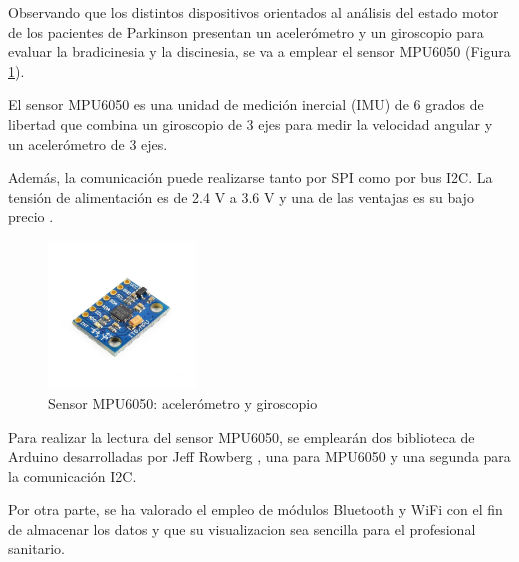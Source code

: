 Observando que los distintos dispositivos orientados al análisis del estado motor de los pacientes de Parkinson presentan un acelerómetro y un giroscopio para evaluar la bradicinesia y la discinesia, se va a emplear el sensor MPU6050 (Figura \ref{fig:MPU6050}). 

El sensor MPU6050 es una unidad de medición inercial (IMU) de 6 grados de libertad que combina un giroscopio de 3 ejes para medir la velocidad angular y un acelerómetro de 3 ejes. 

Además, la comunicación puede realizarse tanto por SPI como por bus I2C. La tensión de alimentación es de 2.4 V a 3.6 V y una de las ventajas es su bajo precio \cite{website:luisllamas-mpu, website:naylampmechatronics}. 

\begin{figure}[ht]
        \centering
        \includegraphics[width=0.35\textwidth]{img/modulo6050.jpg}
        \caption{Sensor MPU6050: acelerómetro y giroscopio  \cite{website:naylampmechatronics} }
        \label{fig:MPU6050}
\end{figure}

Para realizar la lectura del sensor MPU6050, se emplearán dos biblioteca de Arduino desarrolladas por Jeff Rowberg \cite{website:github.com/jrowberg}, una para MPU6050 y una segunda para la comunicación I2C.

Por otra parte, se ha valorado el empleo de módulos Bluetooth y WiFi con el fin de almacenar los datos y que su visualizacion sea sencilla para el profesional sanitario.

